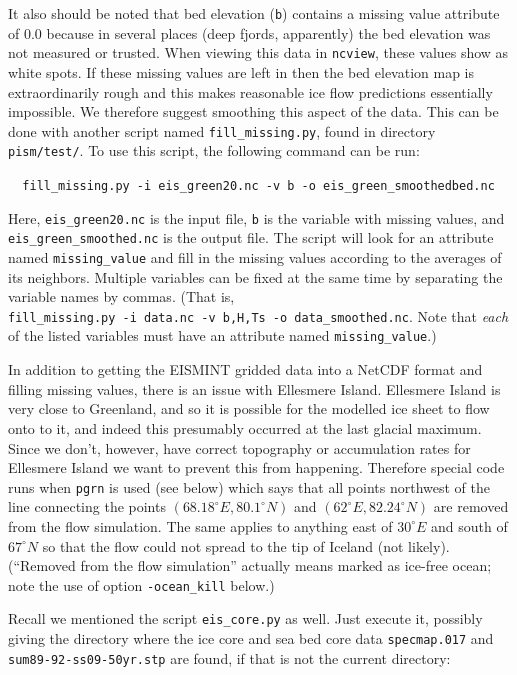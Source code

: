 \documentclass[11pt,final]{amsart}
\begin{document}
It also should be noted that bed elevation (\verb|b|) contains a missing value attribute of $0.0$ because in several places (deep fjords, apparently) the bed elevation was not measured or trusted.  When viewing this data in \verb|ncview|, these values show as white spots. If these missing values are left in then the bed elevation map is extraordinarily rough and this makes reasonable ice flow predictions essentially impossible.  We therefore suggest smoothing this aspect of the data.  This can be done with another script named \verb|fill_missing.py|, found in directory \verb|pism/test/|. To use this script, the following command can be run:

\verb|  fill_missing.py -i eis_green20.nc -v b -o eis_green_smoothedbed.nc|

\noindent Here, \verb|eis_green20.nc| is the input file, \verb|b| is the variable with missing values, and \verb|eis_green_smoothed.nc| is the output file. The script will look for an attribute named \verb|missing_value| and fill in the missing values according to the averages of its neighbors.  Multiple variables can be fixed at the same time by separating the variable names by commas.  (That is,\\
\verb|fill_missing.py -i data.nc -v b,H,Ts -o data_smoothed.nc|.  Note that \emph{each} of the listed variables must have an attribute named \verb|missing_value|.)

In addition to getting the EISMINT gridded data into a NetCDF format and filling missing values, there is an issue with Ellesmere Island.  Ellesmere Island is very close to Greenland, and so it is possible for the modelled ice sheet to flow onto to it, and indeed this presumably occurred at the last glacial maximum.  Since we don't, however, have correct topography or accumulation rates for Ellesmere Island we want to prevent this from happening.  Therefore special code runs when \verb|pgrn| is used (see below) which says that all points northwest of the line connecting the points $(68.18^\circ E, 80.1^\circ N)$ and $(62^\circ E, 82.24^\circ N)$ are removed from the flow simulation.  The same applies to anything east of $30^\circ E$ and south of $67^\circ N$ so that the flow could not spread to the tip of Iceland (not likely).  (``Removed from the flow simulation'' actually means marked as ice-free ocean; note the use of option \verb|-ocean_kill| below.)

Recall we mentioned the script \verb|eis_core.py| as well.  Just execute it, possibly giving the directory where the ice core and sea bed core data \verb|specmap.017| and \verb|sum89-92-ss09-50yr.stp| are found, if that is not the current directory:
\end{document}
